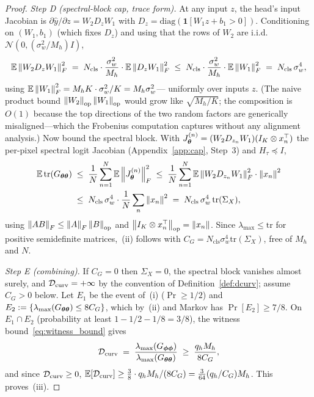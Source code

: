 \begin{proof}
\emph{Step D (spectral-block cap, trace form).} At any input $z$, the head's
input Jacobian is $\partial \hat{y}/\partial z = W_2 D_z W_1$ with
$D_z = \mathrm{diag}(\mathbf{1}[W_1 z + b_1 > 0])$. Conditioning on
$(W_1, b_1)$ (which fixes $D_z$) and using that the rows of $W_2$ are
i.i.d.\ $\mathcal{N}(0, (\sigma_w^2/M_h) I)$,
\[
    \mathbb{E} \left\lVert W_2 D_z W_1\right\rVert_F^2
    \;=\; N_{\mathrm{cls}} \cdot \frac{\sigma_w^2}{M_h}
        \cdot \mathbb{E} \left\lVert D_z W_1\right\rVert_F^2
    \;\leq\; N_{\mathrm{cls}} \cdot \frac{\sigma_w^2}{M_h}
        \cdot \mathbb{E} \left\lVert W_1\right\rVert_F^2
    \;=\; N_{\mathrm{cls}}\, \sigma_w^4 ,
\]
using $\mathbb{E}\left\lVert W_1\right\rVert_F^2 = M_h K \cdot \sigma_w^2/K = M_h \sigma_w^2$---%
uniformly over inputs $z$. (The naive product bound
$\left\lVert W_2\right\rVert_{\mathrm{op}} \left\lVert W_1\right\rVert_{\mathrm{op}}$ would grow like
$\sqrt{M_h/K}$; the composition is $O(1)$ because the top directions of the
two random factors are generically misaligned---which the Frobenius
computation captures without any alignment analysis.) Now bound the spectral
block. With $J_{\boldsymbol{\theta}}^{(n)} = (W_2 D_{z_n} W_1)(I_K \otimes x_n^\top)$ the
per-pixel spectral logit Jacobian (Appendix~\ref{app:cap}, Step~3) and
$H_\tau \preceq I$,
\[
\begin{aligned}
    \mathbb{E}\,\mathrm{tr}(G_{{\boldsymbol{\theta}}{\boldsymbol{\theta}}})
    &\;\leq\; \frac{1}{N} \sum_{n=1}^{N}
        \mathbb{E} \left\lVert J_{\boldsymbol{\theta}}^{(n)}\right\rVert_F^2
    \;\leq\; \frac{1}{N} \sum_{n=1}^{N}
        \mathbb{E} \left\lVert W_2 D_{z_n} W_1\right\rVert_F^2 \cdot \left\lVert x_n\right\rVert^2\\
    &\;\leq\; N_{\mathrm{cls}}\, \sigma_w^4 \cdot
        \frac{1}{N} \sum_n \left\lVert x_n\right\rVert^2
    \;=\; N_{\mathrm{cls}}\, \sigma_w^4\, \mathrm{tr}(\Sigma_X),
\end{aligned}
\]
using $\left\lVert AB\right\rVert_F \leq \left\lVert A\right\rVert_F \left\lVert B\right\rVert_{\mathrm{op}}$ and
$\left\lVert I_K \otimes x_n^\top\right\rVert_{\mathrm{op}} = \left\lVert x_n\right\rVert$. Since
$\lambda_{\max} \leq \mathrm{tr}$ for positive semidefinite matrices,~(ii)
follows with $C_G = N_{\mathrm{cls}} \sigma_w^4 \mathrm{tr}(\Sigma_X)$, free
of $M_h$ and $N$.

\emph{Step E (combining).} If $C_G = 0$ then $\Sigma_X = 0$, the spectral
block vanishes almost surely, and $\mathcal{D}_{\mathrm{curv}} = +\infty$ by the convention of
Definition~\ref{def:dcurv}; assume $C_G > 0$ below. Let $E_1$ be the event
of~(i) ($\Pr \geq 1/2$) and
$E_2 := \{ \lambda_{\max}(G_{{\boldsymbol{\theta}}{\boldsymbol{\theta}}}) \leq 8 C_G \}$, which by~(ii)
and Markov has $\Pr[E_2] \geq 7/8$. On $E_1 \cap E_2$ (probability at least
$1 - 1/2 - 1/8 = 3/8$), the witness bound~\eqref{eq:witness_bound} gives
\[
    \mathcal{D}_{\mathrm{curv}}
    \;=\; \frac{\lambda_{\max}(G_{{\boldsymbol{\phi}}{\boldsymbol{\phi}}})}
               {\lambda_{\max}(G_{{\boldsymbol{\theta}}{\boldsymbol{\theta}}})}
    \;\geq\; \frac{q_h M_h}{8 C_G},
\]
and since $\mathcal{D}_{\mathrm{curv}} \geq 0$, $\mathbb{E}[\mathcal{D}_{\mathrm{curv}}] \geq \tfrac{3}{8} \cdot
q_h M_h / (8 C_G) = \tfrac{3}{64} (q_h/C_G) M_h$. This proves~(iii).
\end{proof}

